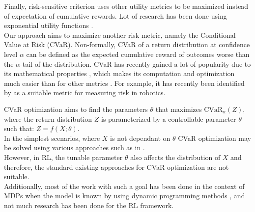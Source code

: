 Finally, risk-sensitive criterion uses other utility metrics to be maximized instead of
expectation of cumulative rewards.
Lot of research has been done using exponential utility functions
\citep{Howard1972,Chung1987}.\\
Our approach aims to maximize
another risk metric, namely the Conditional Value at Risk (CVaR).
Non-formally, CVaR of a return distribution at confidence level $\alpha$ can be defined as the expected
cumulative reward of outcomes worse than the $\alpha$-tail of the distribution.
CVaR has recently gained a lot of popularity due to its mathematical properties \citep{Artzner1999},
which makes its computation and optimization much easier than for other metrics  \citep{Rockafellar2000}.
For example, 
it has recently been identified by \citet{Majumdar2020} as a suitable metric
for measuring risk in robotics.

CVaR optimization aims to find the parameters $\theta$ that maximizes 
$\text{CVaR}_\alpha (Z)$, where the return distribution $Z$ is parameterized by a 
controllable parameter $\theta$ such that: $Z = f(X; \theta)$.\\
In the simplest scenarios, where $X$ is not dependant on $\theta$ CVaR optimization may 
be solved using various approaches such as in \citet{Rockafellar2000}.\\
However, in RL, the tunable parameter $\theta$ also affects the 
distribution of $X$ and therefore, the standard existing approaches for CVaR optimization 
are not suitable.\\
Additionally, most of the work with such a goal has been done in the context of MDPs when
the model is known  by using dynamic programming methods \citep{Chow2015, Petrik2012},
and not much research has been done for the RL framework.

